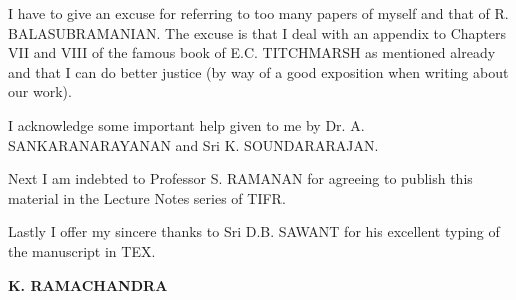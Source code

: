 I have to give an excuse for referring to too many papers of myself
and that of R. BALASUBRAMANIAN. The excuse is that I deal with an
appendix to Chapters VII and VIII of the famous book of
E.C. TITCHMARSH as mentioned already and that I can do better justice
(by way of a good exposition when writing about our work). 

I acknowledge some important help given to me by
Dr. A. SANKA\-RANARAYANAN and Sri K. SOUNDARARAJAN. 

Next I am indebted to Professor S. RAMANAN  for agreeing to publish this material in the Lecture Notes series of TIFR.

Lastly I offer my sincere thanks to Sri D.B. SAWANT for his excellent typing of the manuscript in TEX.

\bigskip

\bigskip


\hfill{\large\bf K. RAMACHANDRA}



